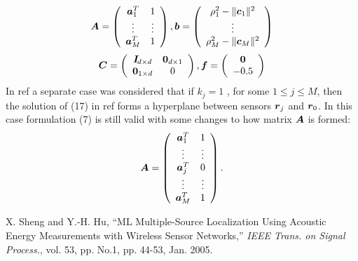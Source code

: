 \documentclass{amsart}
\theoremstyle{definition}
\theoremstyle{remark}
\numberwithin{equation}{section}
\newcommand{\Ba}{\mbox{\boldmath$a$}}
\newcommand{\Bb}{\mbox{\boldmath$b$}}
\newcommand{\Bc}{\mbox{\boldmath$c$}}
\newcommand{\Bf}{\mbox{\boldmath$f$}}
\newcommand{\Br}{\mbox{\boldmath$r$}}
\newcommand{\BA}{\mbox{\boldmath$A$}}
\newcommand{\BC}{\mbox{\boldmath$C$}}
\newcommand{\BO}{\mbox{\boldmath{$0$}}}
\newcommand{\BI}{\mbox{\boldmath$I$}}
\begin{document}
\begin{equation} %
\BA=\left(\begin{array}{cc}
    \Ba_1^T & 1 \\
    \vdots  & \vdots \\
    \Ba_M^T & 1
    \end{array} \right),
\Bb=\left(\begin{array}{c}
    \rho_1^2 - \|\Bc_1\|^2 \\
    \vdots \\
    \rho_M^2 - \|\Bc_M\|^2
    \end{array} \right)
\end{equation}
\begin{equation} %
\BC=\left(\begin{array}{cc}
    \BI\!_{d\times d} & \BO_{d\times 1} \\
    \BO_{1\times d} & 0
    \end{array} \right),
\Bf=\left(\begin{array}{c}\BO \\ -0.5 \end{array} \right)
\end{equation}
In ref \cite{1} a separate case was considered that if $k_j = 1$ , for some $1 \leq j\leq M$, then the solution of (17) in ref \cite{1} forms a hyperplane between sensors $\Br_j$ and $\Br_0$. In this case formulation (7) is still valid with some changes to how matrix $\BA$ is formed:
\begin{equation} %
\BA=\left(\begin{array}{cc}
    \Ba_1^T & 1 \\
    \vdots  & \vdots \\
    \Ba_j^T & 0 \\
    \vdots  & \vdots \\
    \Ba_M^T & 1
    \end{array} \right).
\end{equation}
%
%

%
\begin{thebibliography}{99}


X. Sheng and Y.-H. Hu, ``ML Multiple-Source Localization Using Acoustic Energy Measurements with Wireless Sensor Networks,'' {\em IEEE Trans. on Signal Process.}, vol. 53, pp. No.1, pp. 44-53, Jan. 2005.

\end{thebibliography}
\end{document}
